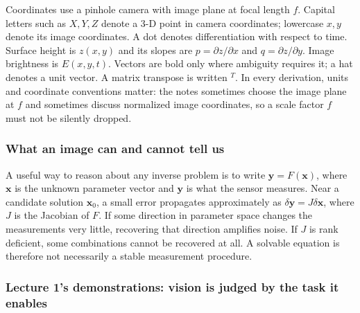 \hypertarget{03-visual-computing-i-ch001-learning-path-and-conventions}{}

Coordinates use a pinhole camera with image plane at focal length \(f\). Capital letters such as \(X,Y,Z\) denote a 3-D point in camera coordinates; lowercase \(x,y\) denote its image coordinates. A dot denotes differentiation with respect to time. Surface height is \(z(x,y)\) and its slopes are \(p=\partial z/\partial x\) and \(q=\partial z/\partial y\). Image brightness is \(E(x,y,t)\). Vectors are bold only where ambiguity requires it; a hat denotes a unit vector. A matrix transpose is written \(^T\). In every derivation, units and coordinate conventions matter: the notes sometimes choose the image plane at \(f\) and sometimes discuss normalized image coordinates, so a scale factor \(f\) must not be silently dropped.

\subsubsection{What an image can and cannot tell us}\label{03-visual-computing-i-ch001-what-an-image-can-and-cannot-tell-us}

\hypertarget{03-visual-computing-i-ch001-what-an-image-can-and-cannot-tell-us}{}

A useful way to reason about any inverse problem is to write \(\mathbf{y}=F(\mathbf{x})\), where \(\mathbf{x}\) is the unknown parameter vector and \(\mathbf{y}\) is what the sensor measures. Near a candidate solution \(\mathbf{x}_0\), a small error propagates approximately as \(\delta\mathbf{y}=J\delta\mathbf{x}\), where \(J\) is the Jacobian of \(F\). If some direction in parameter space changes the measurements very little, recovering that direction amplifies noise. If \(J\) is rank deficient, some combinations cannot be recovered at all. A solvable equation is therefore not necessarily a stable measurement procedure.

\subsubsection{Lecture 1's demonstrations: vision is judged by the task it enables}\label{03-visual-computing-i-ch001-lecture-1s-demonstrations-vision-is-judged-by-the-task-it-enables}

\hypertarget{03-visual-computing-i-ch001-lecture-1s-demonstrations-vision-is-judged-by-the-task-it-enables}{}

